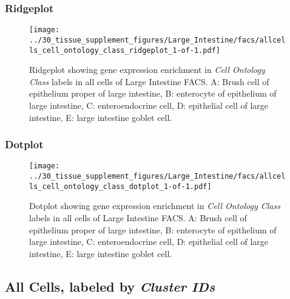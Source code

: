\clearpage

\subsubsection{Ridgeplot}
\begin{figure}[h]
\centering
\texttt{[image: ../30\_tissue\_supplement\_figures/Large\_Intestine/facs/allcells\_cell\_ontology\_class\_ridgeplot\_1-of-1.pdf]}

\caption{ Ridgeplot  showing gene expression enrichment in \emph{Cell Ontology Class} labels in all cells of Large Intestine FACS. A: Brush cell of epithelium proper of large intestine, B: enterocyte of epithelium of large intestine, C: enteroendocrine cell, D: epithelial cell of large intestine, E: large intestine goblet cell.}
\end{figure}


\clearpage

\subsubsection{Dotplot}
\begin{figure}[h]
\centering
\texttt{[image: ../30\_tissue\_supplement\_figures/Large\_Intestine/facs/allcells\_cell\_ontology\_class\_dotplot\_1-of-1.pdf]}

\caption{ Dotplot  showing gene expression enrichment in \emph{Cell Ontology Class} labels in all cells of Large Intestine FACS. A: Brush cell of epithelium proper of large intestine, B: enterocyte of epithelium of large intestine, C: enteroendocrine cell, D: epithelial cell of large intestine, E: large intestine goblet cell.}
\end{figure}


\clearpage

\subsection{All Cells, labeled by \emph{Cluster IDs}}
